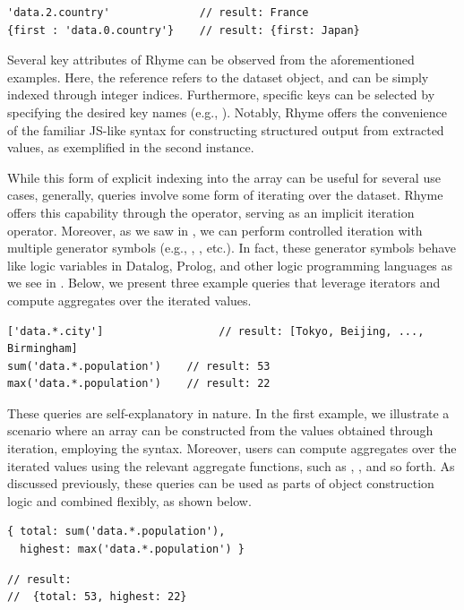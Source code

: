 \documentclass[runningheads]{llncs}
\newcommand{\lang}{Rhyme}
\begin{document}
\begin{lstlisting}[style=JavaScript]
'data.2.country'              // result: France
{first : 'data.0.country'}    // result: {first: Japan}
\end{lstlisting}

Several key attributes of \lang{} can be observed from the aforementioned examples.
Here, the reference  refers to
the dataset object, 
and can be simply indexed through integer indices.
Furthermore, specific keys can be selected by specifying the desired
key names (e.g., ).
Notably, \lang{} offers the convenience of the familiar JS-like syntax for constructing
structured output from extracted values, as exemplified in the second instance.

While this form of explicit indexing into the array can be useful for several
use cases, generally, queries involve some form of iterating over the dataset.
\lang{} offers this capability through the \inline{*} operator,
serving as an implicit iteration operator.
Moreover, as we saw in , we can perform controlled iteration with multiple
generator symbols (e.g., , , etc.).
In fact, these generator symbols behave like logic variables in Datalog, Prolog,
and other logic programming languages as we see in .
Below, we present three example queries that leverage iterators and compute
aggregates over the iterated values.

\begin{lstlisting}[style=JavaScript, columns=flexible]
['data.*.city']                  // result: [Tokyo, Beijing, ..., Birmingham]
sum('data.*.population')    // result: 53
max('data.*.population')    // result: 22
\end{lstlisting}

These queries are self-explanatory in nature.
In the first example, we illustrate a scenario where an array can be constructed
from the values obtained through iteration, employing the \inline{[...]} syntax.
Moreover, users can compute aggregates over the iterated values using the
relevant aggregate functions, such as , , and so forth.
As discussed previously, these queries can be used as parts of object
construction logic and combined flexibly, as shown below.

\hspace{-18pt}
\begin{minipage}{0.5\textwidth}
\begin{lstlisting}[style=JavaScript, columns=flexible, numbers=none]
{ total: sum('data.*.population'), 
  highest: max('data.*.population') }
\end{lstlisting}
\end{minipage}%
\begin{minipage}{0.5\textwidth}
\begin{lstlisting}[style=JavaScript, columns=flexible, numbers=none]
// result: 
//  {total: 53, highest: 22}
\end{lstlisting}
\end{minipage}
\end{document}
